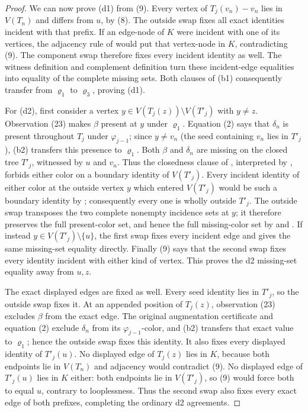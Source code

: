 \begin{proof}
We can now prove (d1) from (9).  Every vertex of
\(T_j(v_n)-v_n\) lies in \(V(T_n)\) and differs from \(u\), by (8).
The outside swap fixes all exact identities incident with that prefix.
If an edge-node of \(K\) were incident with one of its vertices, the
adjacency rule of  would put that
vertex-node in \(K\), contradicting (9).  The component swap therefore
fixes every incident identity as well.  The witness definition
 and complement definition
 turn these incident-edge equalities into equality
of the complete missing sets.  Both clauses of (b1) consequently transfer
from \(\varrho_1\) to \(\varrho_3\), proving (d1).

For (d2), first consider a vertex
\(y\in V(T_j(z))\setminus V(T'_j)\) with \(y\ne z\).  Observation (23)
makes \(\beta\) present at \(y\) under \(\varrho_1\).  Equation (2) says
that \(\delta_n\) is present throughout \(T_j\) under
\(\varphi_{j-1}\); since \(y\ne v_n\) (the seed containing \(v_n\)
lies in \(T'_j\)), (b2) transfers this presence to \(\varrho_1\).
Both \(\beta\) and \(\delta_n\) are missing on the closed tree \(T'_j\),
witnessed by \(u\) and \(v_n\).  Thus the closedness clause of
, interpreted by
, forbids either color on a boundary
identity of \(V(T'_j)\).  Every incident identity of either color at the
outside vertex \(y\) which entered \(V(T'_j)\) would be such a boundary
identity by ; consequently every one is wholly
outside \(T'_j\).  The outside swap
transposes the two complete nonempty incidence sets at \(y\); it therefore
preserves the full present-color set, and hence the full missing-color set
by  and .  If instead
\(y\in V(T'_j)\setminus\{u\}\), the first swap fixes every incident edge
and gives the same missing-set equality directly.  Finally (9) says that
the second swap fixes every identity incident with either kind of vertex.
This proves the d2 missing-set equality away from \(u,z\).

The exact displayed edges are fixed as well.  Every seed identity lies in
\(T'_j\), so the outside swap fixes it.  At an appended position of
\(T_j(z)\), observation (23) excludes \(\beta\) from the exact edge.
The original augmentation certificate and equation (2) exclude
\(\delta_n\) from its \(\varphi_{j-1}\)-color, and (b2) transfers that
exact value to \(\varrho_1\); hence the outside swap fixes this identity.
It also fixes every displayed identity of \(T'_j(u)\).  No displayed edge
of \(T_j(z)\) lies in \(K\), because both endpoints lie in \(V(T_n)\)
and adjacency would contradict (9).  No displayed edge of \(T'_j(u)\)
lies in \(K\) either: both endpoints lie in \(V(T'_j)\), so (9) would
force both to equal \(u\), contrary to looplessness.  Thus the second
swap also fixes every exact edge of both prefixes, completing the ordinary
d2 agreements.


\end{proof}
